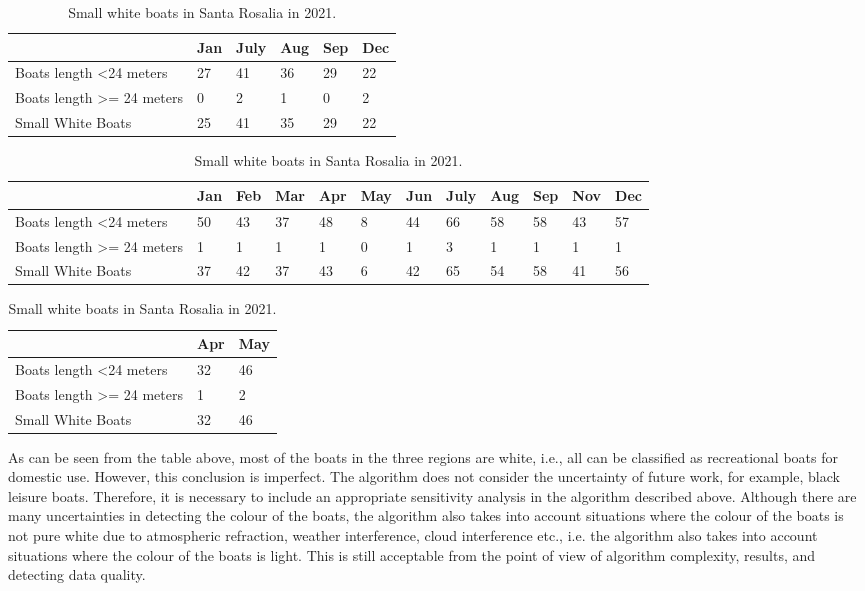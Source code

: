 \begin{table}[p]
\begin{tabular}{|l|l|l|l|l|l|}
\hline
                                       & Jan & July & Aug & Sep & Dec \\ \hline
Boats length \textless 24 meters       & 27  & 41   & 36  & 29  & 22  \\ \hline
Boats length \textgreater{}= 24 meters & 0   & 2    & 1   & 0   & 2   \\ \hline
Small White Boats                      & 25  & 41   & 35  & 29  & 22  \\ \hline
\end{tabular}
\caption{Small white boats in Santa Rosalia in 2019.}


\begin{tabular}{|p{2.4cm}|l|l|l|l|l|l|l|l|l|l|l|}
\hline
                                       & Jan & Feb & Mar & Apr & May & Jun & July & Aug & Sep & Nov & Dec \\ \hline
Boats length \textless 24 meters       & 50  & 43  & 37  & 48  & 8   & 44  & 66   & 58  & 58  & 43  & 57  \\ \hline
Boats length \textgreater{}= 24 meters & 1   & 1   & 1   & 1   & 0   & 1   & 3    & 1   & 1   & 1   & 1   \\ \hline
Small White Boats                      & 37  & 42  & 37  & 43  & 6   & 42  & 65   & 54  & 58  & 41  & 56  \\ \hline
\end{tabular}
\caption{Small white boats in Santa Rosalia 2020.}


\begin{tabular}{|l|l|l|}
\hline
                                       & Apr & May \\ \hline
Boats length \textless 24 meters       & 32  & 46  \\ \hline
Boats length \textgreater{}= 24 meters & 1   & 2   \\ \hline
Small White Boats                      & 32  & 46  \\ \hline
\end{tabular}
\caption{Small white boats in Santa Rosalia in 2021.}
\end{table}


As can be seen from the table above, most of the boats in the three regions are white, i.e., all can be classified as recreational boats for domestic use. However, this conclusion is imperfect. The algorithm does not consider the uncertainty of future work, for example, black leisure boats. Therefore, it is necessary to include an appropriate sensitivity analysis in the algorithm described above. Although there are many uncertainties in detecting the colour of the boats, the algorithm also takes into account situations where the colour of the boats is not pure white due to atmospheric refraction, weather interference, cloud interference etc., i.e. the algorithm also takes into account situations where the colour of the boats is light. This is still acceptable from the point of view of algorithm complexity, results, and detecting data quality.
